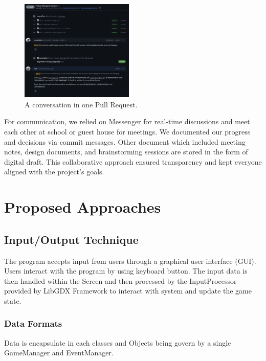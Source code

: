 \documentclass[conference]{IEEEtran}
\begin{document}
\begin{figure}[htbp]
    \centerline{\includegraphics[width=0.48\textwidth]{assets/github-pr.png}}
    \caption{A conversation in one Pull Request.}\label{fig:github-pr}
\end{figure}

For communication, we relied on Messenger for real-time discussions and meet
each other at school or guest house for meetings. We documented our progress
and decisions via commit messages. Other document which included meeting notes,
design documents, and brainstorming sessions are stored in the form of digital
draft. This collaborative approach ensured transparency and kept everyone
aligned with the project's goals.

\section{Proposed Approaches}

\subsection{Input/Output Technique}

The program accepts input from users through a graphical user interface (GUI).
Users interact with the program by using keyboard button. The input data is
then handled within the Screen and then processed by the InputProcessor
provided by LibGDX Framework to interact with system and update the game state.

\subsubsection{Data Formats}
Data is encapsulate in each classes and Objects being govern by a single
GameManager and EventManager.
\end{document}

